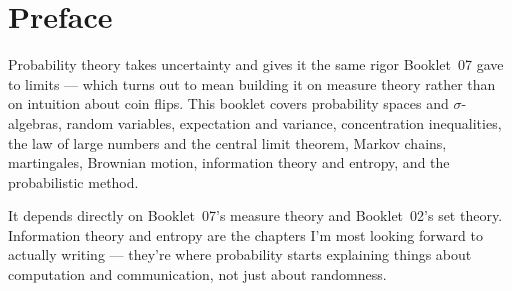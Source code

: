 \chapter*{Preface}

Probability theory takes uncertainty and gives it the same
rigor Booklet~07 gave to limits --- which turns out to mean building it
on measure theory rather than on intuition about coin flips. This
booklet covers probability spaces and $\sigma$-algebras, random
variables, expectation and variance, concentration inequalities, the
law of large numbers and the central limit theorem, Markov chains,
martingales, Brownian motion, information theory and entropy, and the
probabilistic method.

It depends directly on Booklet~07's measure theory and Booklet~02's set
theory. Information theory and entropy are the chapters I'm most
looking forward to actually writing --- they're where probability
starts explaining things about computation and communication, not just
about randomness.
